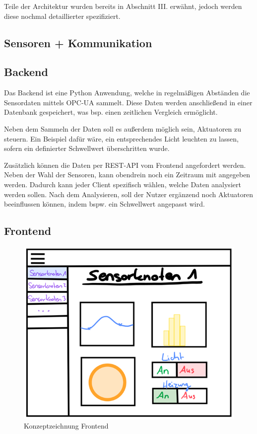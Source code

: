 \documentclass[letterpaper, 10 pt, conference]{ieeeconf}  %
\begin{document}
Teile der Architektur wurden bereits in Abschnitt III. erwähnt, jedoch werden diese nochmal detaillierter spezifiziert.

\subsection{Sensoren + Kommunikation}

\subsection{Backend}

Das Backend ist eine Python Anwendung, welche in regelmäßigen Abständen die Sensordaten mittels OPC-UA sammelt.
Diese Daten werden anschließend in einer Datenbank gespeichert, was bsp. einen zeitlichen Vergleich ermöglicht.

Neben dem Sammeln der Daten soll es außerdem möglich sein, Aktuatoren zu steuern. 
Ein Beispiel dafür wäre, ein entsprechendes Licht leuchten zu lassen, sofern ein definierter Schwellwert überschritten wurde.

Zusätzlich können die Daten per REST-API vom Frontend angefordert werden. 
Neben der Wahl der Sensoren, kann obendrein noch ein Zeitraum mit angegeben werden. 
Dadurch kann jeder Client spezifisch wählen, welche Daten analysiert werden sollen.
Nach dem Analysieren, soll der Nutzer ergänzend noch Aktuatoren beeinflussen können, indem bspw. ein Schwellwert angepasst wird. 

\subsection{Frontend}

\begin{figure}[thpb]
      \centering
      \includegraphics[scale=0.55]{abbildungen/frontend.png}
      \caption{Konzeptzeichnung Frontend}
      \label{fig:frontend}
 \end{figure}
 
\end{document}

